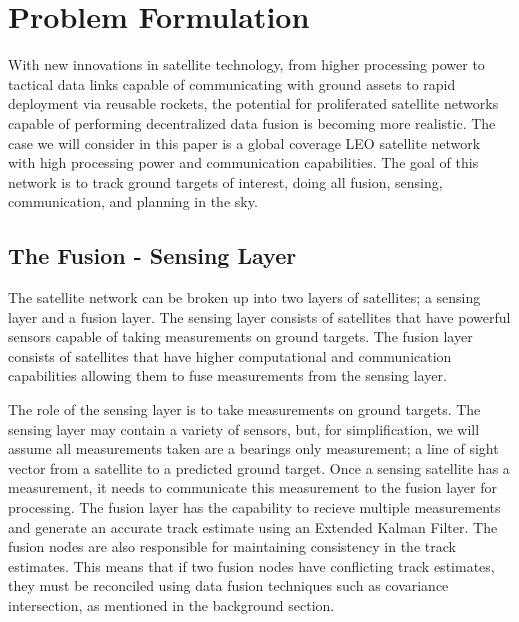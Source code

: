 \section{Problem Formulation}

With new innovations in satellite technology, from higher processing power to tactical data links capable of communicating with ground assets \cite{b10} to rapid deployment via reusable rockets, the potential for proliferated satellite networks 
capable of performing decentralized data fusion is becoming more realistic.
The case we will consider in this paper is a global coverage LEO satellite network with high processing power and communication capabilities. 
The goal of this network is to track ground targets of interest, doing all fusion, sensing, communication, and planning in the sky.

\subsection{The Fusion - Sensing Layer}




    The satellite network can be broken up into two layers of satellites; a sensing layer and a fusion layer. 
    The sensing layer consists of satellites that have powerful sensors capable of taking measurements on ground targets. 
    The fusion layer consists of satellites that have higher computational and communication capabilities allowing them to fuse measurements from the sensing layer. 

    The role of the sensing layer is to take measurements on ground targets. The sensing layer may contain a variety of sensors, 
    but, for simplification, we will assume all measurements taken are a bearings only measurement; a line of sight vector from a satellite to a predicted ground target.
    Once a sensing satellite has a measurement, it needs to communicate this measurement to the fusion layer for processing. 
    The fusion layer has the capability to recieve multiple measurements and generate an accurate track estimate using an Extended Kalman Filter. 
    The fusion nodes are also responsible for maintaining consistency in the track estimates. 
    This means that if two fusion nodes have conflicting track estimates, they must be reconciled using data fusion techniques such as covariance intersection, as mentioned in the background section.

